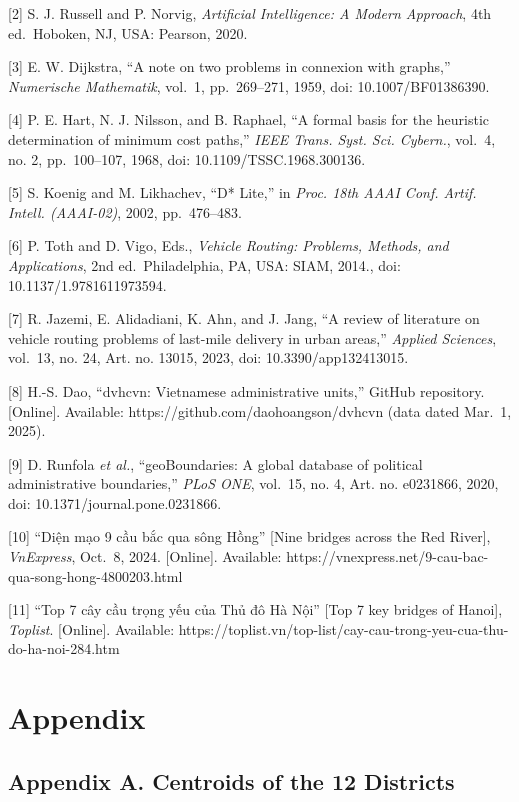 \documentclass[12pt,a4paper]{article}
\begin{document}
{[}2{]} S. J. Russell and P. Norvig, \emph{Artificial
Intelligence: A Modern Approach}, 4th ed.~Hoboken, NJ, USA:
Pearson, 2020.

{[}3{]} E. W. Dijkstra, ``A note on two problems in
connexion with graphs,'' \emph{Numerische Mathematik},
vol.~1, pp.~269--271, 1959, doi: 10.1007/BF01386390.

{[}4{]} P. E. Hart, N. J. Nilsson, and B. Raphael, ``A
formal basis for the heuristic determination of minimum cost
paths,'' \emph{IEEE Trans. Syst. Sci. Cybern.}, vol.~4, no.
2, pp.~100--107, 1968, doi: 10.1109/TSSC.1968.300136.

{[}5{]} S. Koenig and M. Likhachev, ``D* Lite,'' in
\emph{Proc. 18th AAAI Conf. Artif. Intell. (AAAI-02)}, 2002,
pp.~476--483.

{[}6{]} P. Toth and D. Vigo, Eds., \emph{Vehicle Routing:
Problems, Methods, and Applications}, 2nd ed.~Philadelphia,
PA, USA: SIAM, 2014., doi: 10.1137/1.9781611973594.

{[}7{]} R. Jazemi, E. Alidadiani, K. Ahn, and J. Jang, ``A
review of literature on vehicle routing problems of
last-mile delivery in urban areas,'' \emph{Applied
Sciences}, vol.~13, no. 24, Art. no. 13015, 2023, doi:
10.3390/app132413015.

{[}8{]} H.-S. Dao, ``dvhcvn: Vietnamese administrative
units,'' GitHub repository. {[}Online{]}. Available:
https://github.com/daohoangson/dvhcvn (data dated Mar.~1,
2025).

{[}9{]} D. Runfola \emph{et al.}, ``geoBoundaries: A global
database of political administrative boundaries,''
\emph{PLoS ONE}, vol.~15, no. 4, Art. no. e0231866, 2020,
doi: 10.1371/journal.pone.0231866.

{[}10{]} ``Diện mạo 9 cầu bắc qua sông Hồng'' {[}Nine
bridges across the Red River{]}, \emph{VnExpress}, Oct.~8,
2024. {[}Online{]}. Available:
https://vnexpress.net/9-cau-bac-qua-song-hong-4800203.html

{[}11{]} ``Top 7 cây cầu trọng yếu của Thủ đô Hà Nội''
{[}Top 7 key bridges of Hanoi{]}, \emph{Toplist}.
{[}Online{]}. Available:
https://toplist.vn/top-list/cay-cau-trong-yeu-cua-thu-do-ha-noi-284.htm

\appendix
\section*{Appendix}

\subsection*{Appendix A. Centroids of the 12 Districts}
\end{document}
